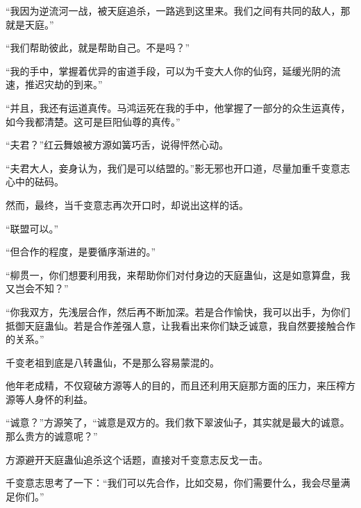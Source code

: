 \begin{this_body}
“我因为逆流河一战，被天庭追杀，一路逃到这里来。我们之间有共同的敌人，那就是天庭。”

“我们帮助彼此，就是帮助自己。不是吗？”

“我的手中，掌握着优异的宙道手段，可以为千变大人你的仙窍，延缓光阴的流速，推迟灾劫的到来。”

“并且，我还有运道真传。马鸿运死在我的手中，他掌握了一部分的众生运真传，如今我都清楚。这可是巨阳仙尊的真传。”

“夫君？”红云舞娘被方源如簧巧舌，说得怦然心动。

“夫君大人，妾身认为，我们是可以结盟的。”影无邪也开口道，尽量加重千变意志心中的砝码。

然而，最终，当千变意志再次开口时，却说出这样的话。

“联盟可以。”

“但合作的程度，是要循序渐进的。”

“柳贯一，你们想要利用我，来帮助你们对付身边的天庭蛊仙，这是如意算盘，我又岂会不知？”

“你我双方，先浅层合作，然后再不断加深。若是合作愉快，我可以出手，为你们抵御天庭蛊仙。若是合作差强人意，让我看出来你们缺乏诚意，我自然要接触合作的关系。”

千变老祖到底是八转蛊仙，不是那么容易蒙混的。

他年老成精，不仅窥破方源等人的目的，而且还利用天庭那方面的压力，来压榨方源等人身怀的利益。

“诚意？”方源笑了，“诚意是双方的。我们救下翠波仙子，其实就是最大的诚意。那么贵方的诚意呢？”

方源避开天庭蛊仙追杀这个话题，直接对千变意志反戈一击。

千变意志思考了一下：“我们可以先合作，比如交易，你们需要什么，我会尽量满足你们。”

\end{this_body}

